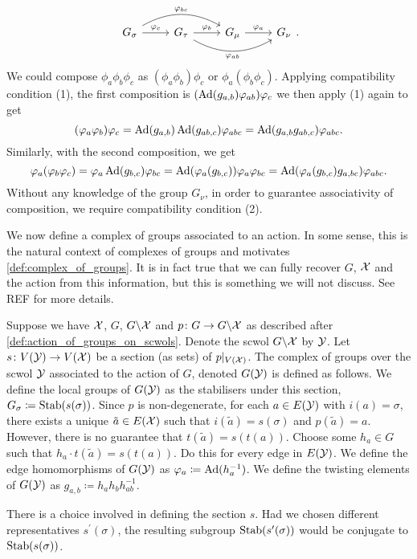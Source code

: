 \[
	\begin{tikzcd}
		G_\sigma \ar[r, "\phi_c"] \ar[rr, bend left, "\phi_{bc}"] & G_\tau \ar[r, "\phi_b"] \ar[rr, bend right, "\phi_{ab}"'] & G_\mu \ar[r, "\phi_a"] & G_\nu
	\end{tikzcd}
	.\]
We could compose $\phi_a\phi_b\phi_c$ as $(\phi_a\phi_b)\phi_c$ or $\phi_a(\phi_b\phi_c)$.
Applying compatibility condition (1), the first composition is $(\operatorname{Ad}(g_{a,b})\varphi_{ab})\varphi_c$ we then apply (1) again to get
\[
	(\varphi_a\varphi_b)\varphi_c = \operatorname{Ad}(g_{a,b})\operatorname{Ad}(g_{ab,c})\varphi_{abc} = \operatorname{Ad}(g_{a,b}g_{ab,c})\varphi_{abc}
	.\]
Similarly, with the second composition, we get
\[
	\varphi_a(\varphi_b\varphi_c) = \varphi_a\operatorname{Ad}(g_{b,c})\varphi_{bc} = \operatorname{Ad}(\varphi_a(g_{b,c}))\varphi_a\varphi_{bc} = \operatorname{Ad}(\varphi_a(g_{b,c})g_{a,bc})\varphi_{abc}
	.\]
Without any knowledge of the group $G_\nu$, in order to guarantee associativity of composition, we require compatibility condition (2).

We now define a complex of groups associated to an action.
In some sense, this is the natural context of complexes of groups and motivates  \cref{def:complex_of_groups}.
It is in fact true that we can fully recover $G$, $\mathcal{X}$ and the action from this information, but this is something we will not discuss.
See REF for more details.
\begin{definition}
	Suppose we have $\mathcal{X}$, $G$, $G \backslash \mathcal{X}$ and $p \colon G \to G \backslash \mathcal{X}$ as described after \cref{def:action_of_groups_on_scwols}.
	Denote the scwol $G \backslash \mathcal{X}$ by $\mathcal{Y}$.
	Let $s \colon V(\mathcal{Y}) \to V(\mathcal{X})$ be a section (as sets) of $p|_{V(\mathcal{X})}$.
	The complex of groups over the scwol $\mathcal{Y}$ associated to the action of $G$, denoted $G(\mathcal{Y})$ is defined as follows.
	We define the local groups of $G(\mathcal{Y})$ as the stabilisers under this section, $G_\sigma \coloneqq \operatorname{Stab}(s(\sigma))$.
	Since $p$ is non-degenerate, for each $a \in E(\mathcal{Y})$ with $i(a) = \sigma$, there exists a unique $\tilde{a} \in E(\mathcal{X})$ such that $i(\tilde{a}) = s(\sigma)$ and $p(\tilde{a}) = a$.
	However, there is no guarantee that $t(\tilde{a}) = s(t(a))$.
	Choose some $h_a \in G$ such that $h_a \cdot t(\tilde{a}) = s(t(a))$.
	Do this for every edge in $E(\mathcal{Y})$.
	We define the edge homomorphisms of $G(\mathcal{Y})$ as $\varphi_a \coloneqq \operatorname{Ad}(h_a^{-1})$.
	We define the twisting elements of $G(\mathcal{Y})$ as $g_{a,b} \coloneq h_ah_bh_{ab}^{-1}$.
\end{definition}

There is a choice involved in defining the section $s$.
Had we chosen different representatives $s^\prime(\sigma)$, the resulting  subgroup $\operatorname{Stab}(s^\prime(\sigma))$ would be conjugate to $\operatorname{Stab}(s(\sigma))$.

